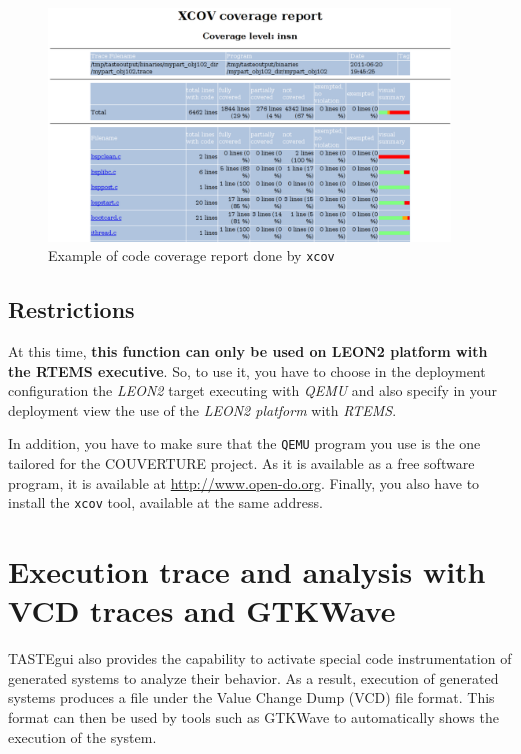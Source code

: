 \documentclass[11pt]{book}
\begin{document}
   \begin{figure}[!h]
   \centering
   \includegraphics[width=0.95\textwidth]{imgs/tastegui-xcov-report}
   \caption{Example of code coverage report done by \texttt{xcov}}
   \label{tastegui-xcov-report}
   \end{figure}


      \subsection{Restrictions}
      \label{code-coverage-restrictions}
      At this time, \textbf{this function can only be used on LEON2 platform with the RTEMS executive}.
      So, to use it, you have to choose in the deployment configuration the
      \textit{LEON2} target executing with \textit{QEMU} and also specify in
      your deployment view the use of the \textit{LEON2 platform} with
      \textit{RTEMS}.

      In addition, you have to make sure that the \texttt{QEMU} program you use is the
      one tailored for the COUVERTURE project. As it is available as a free
      software program, it is available at \url{http://www.open-do.org}.
      Finally, you also have to install the \texttt{xcov} tool, available at the
      same address.


   \section{Execution trace and analysis with VCD traces and GTKWave}
   TASTEgui also provides the capability to activate special code
   instrumentation of generated systems to analyze their behavior. As a result,
   execution of generated systems produces a file under the Value Change Dump
   (VCD) file format. This format can then be used by tools such as GTKWave to
   automatically shows the execution of the system.
\end{document}
